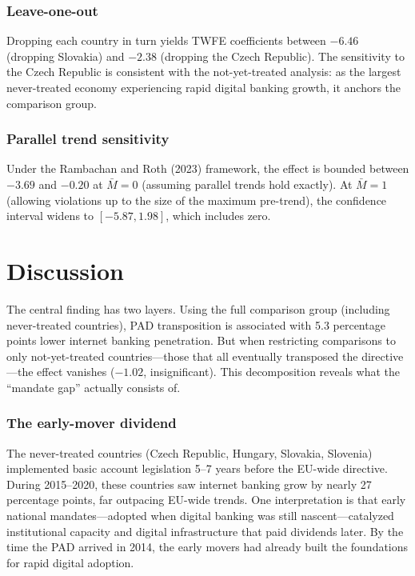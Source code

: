 \documentclass[12pt]{article}
\begin{document}
\subsubsection*{Leave-one-out} Dropping each country in turn yields TWFE coefficients between $-6.46$ (dropping Slovakia) and $-2.38$ (dropping the Czech Republic). The sensitivity to the Czech Republic is consistent with the not-yet-treated analysis: as the largest never-treated economy experiencing rapid digital banking growth, it anchors the comparison group.

\subsubsection*{Parallel trend sensitivity} Under the Rambachan and Roth (2023) framework, the effect is bounded between $-3.69$ and $-0.20$ at $\bar{M} = 0$ (assuming parallel trends hold exactly). At $\bar{M} = 1$ (allowing violations up to the size of the maximum pre-trend), the confidence interval widens to $[-5.87, 1.98]$, which includes zero.


\section{Discussion}
\label{sec:discussion}

The central finding has two layers. Using the full comparison group (including never-treated countries), PAD transposition is associated with 5.3 percentage points lower internet banking penetration. But when restricting comparisons to only not-yet-treated countries---those that all eventually transposed the directive---the effect vanishes ($-1.02$, insignificant). This decomposition reveals what the ``mandate gap'' actually consists of.

\subsubsection*{The early-mover dividend} The never-treated countries (Czech Republic, Hungary, Slovakia, Slovenia) implemented basic account legislation 5--7 years before the EU-wide directive. During 2015--2020, these countries saw internet banking grow by nearly 27 percentage points, far outpacing EU-wide trends. One interpretation is that early national mandates---adopted when digital banking was still nascent---catalyzed institutional capacity and digital infrastructure that paid dividends later. By the time the PAD arrived in 2014, the early movers had already built the foundations for rapid digital adoption.
\end{document}
